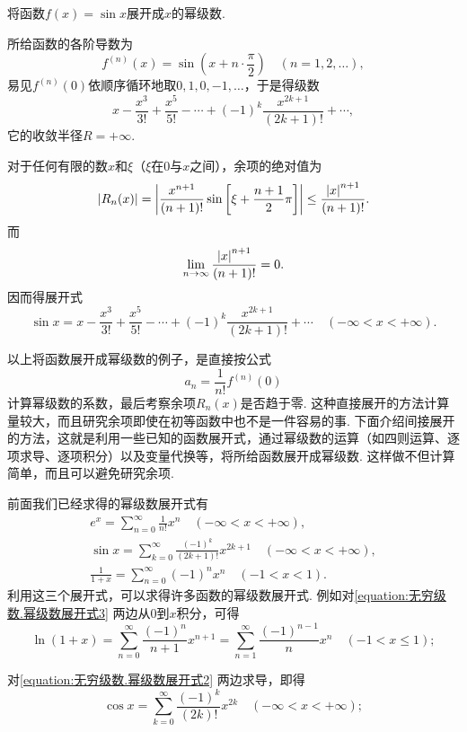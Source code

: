 \begin{example}
将函数\(f(x) = \sin x\)展开成\(x\)的幂级数.
\begin{solution}
所给函数的各阶导数为\[
f^{(n)}(x) = \sin\left(x + n\cdot\frac{\pi}{2}\right)
\quad(n=1,2,\dotsc),
\]易见\(f^{(n)}(0)\)依顺序循环地取\(0,1,0,-1,\dotsc\)，于是得级数\[
x-\frac{x^3}{3!}+\frac{x^5}{5!}-\dotsb+(-1)^k \frac{x^{2k+1}}{(2k+1)!}+\dotsb,
\]它的收敛半径\(R=+\infty\).

对于任何有限的数\(x\)和\(\xi\)（\(\xi\)在\(0\)与\(x\)之间），余项的绝对值为\[
\abs{R_n(x)}
= \abs{ \frac{x^{n+1}}{(n+1)!} \sin\left[\xi+\frac{n+1}{2}\pi\right] }
\leq \frac{\abs{x}^{n+1}}{(n+1)!}.
\]而\[
\lim\limits_{n\to\infty} \frac{\abs{x}^{n+1}}{(n+1)!} = 0.
\]因而得展开式\[
\sin x = x-\frac{x^3}{3!}+\frac{x^5}{5!}-\dotsb+(-1)^k \frac{x^{2k+1}}{(2k+1)!}+\dotsb
\quad(-\infty<x<+\infty).
\]
\end{solution}
\end{example}

以上将函数展开成幂级数的例子，是直接按公式\[
a_n = \frac{1}{n!} f^{(n)}(0)
\]计算幂级数的系数，最后考察余项\(R_n(x)\)是否趋于零.
这种直接展开的方法计算量较大，而且研究余项即使在初等函数中也不是一件容易的事.
下面介绍间接展开的方法，这就是利用一些已知的函数展开式，通过幂级数的运算（如四则运算、逐项求导、逐项积分）以及变量代换等，将所给函数展开成幂级数.
这样做不但计算简单，而且可以避免研究余项.

前面我们已经求得的幂级数展开式有\begin{gather}
e^x = \sum\limits_{n=0}^\infty \frac{1}{n!} x^n
	\quad(-\infty<x<+\infty), \label{equation:无穷级数.幂级数展开式1} \\
\sin x = \sum\limits_{k=0}^\infty \frac{(-1)^k}{(2k+1)!} x^{2k+1}
	\quad(-\infty<x<+\infty), \label{equation:无穷级数.幂级数展开式2} \\
\frac{1}{1+x} = \sum\limits_{n=0}^\infty (-1)^n x^n
	\quad(-1<x<1). \label{equation:无穷级数.幂级数展开式3}
\end{gather}
利用这三个展开式，可以求得许多函数的幂级数展开式.
例如对\cref{equation:无穷级数.幂级数展开式3} 两边从\(0\)到\(x\)积分，可得
\begin{equation}\label{equation:无穷级数.幂级数展开式4}
\ln(1+x) = \sum\limits_{n=0}^\infty \frac{(-1)^n}{n+1} x^{n+1}
= \sum\limits_{n=1}^\infty \frac{(-1)^{n-1}}{n} x^n
\quad(-1<x\leq1);
\end{equation}

对\cref{equation:无穷级数.幂级数展开式2} 两边求导，即得
\begin{equation}\label{equation:无穷级数.幂级数展开式5}
\cos x = \sum\limits_{k=0}^\infty \frac{(-1)^k}{(2k)!} x^{2k}
\quad(-\infty<x<+\infty);
\end{equation}


